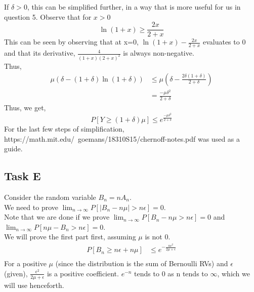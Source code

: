 \begin{enumerate}
    If $\delta > 0$, this can be simplified further, in a way that is more useful for us in question 5. Observe that for $x > 0$
    \[
        \ln(1+x) \ge \frac{2x}{2+x}
    \]
    This can be seen by observing that at x=0, $\ln(1+x)-\frac{2x}{2+x}$ evaluates to 0 and that its derivative, $\frac{4}{(1+x)(2+x)^2}$ is always non-negative.\\
    Thus, 
    \begin{align*}
        \mu (\delta - (1+\delta)\ln(1+\delta)) &\le \mu (\delta - \frac{2\delta(1+\delta)}{2+\delta})\\
        &= \frac{-\mu\delta^2}{2+\delta}
    \end{align*}
    Thus, we get,
    \begin{equation}
        \label{eq:2}
        P[Y\ge (1+\delta)\mu] \le e^{\frac{-\mu\delta^2}{2+\delta}}
    \end{equation}
    For the last few steps of simplification, https://math.mit.edu/~goemans/18310S15/chernoff-notes.pdf was used as a guide.
\end{enumerate}
\subsection{Task E}
Consider the random variable $B_n = nA_n$.\\
We need to prove $\lim_{n\to \infty}P[\lvert B_n - n\mu\rvert> n\epsilon]=0$.\\
Note that we are done if we prove $\lim_{n\to \infty}P[B_n - n\mu > n\epsilon]=0$ and $\lim_{n\to \infty}P[n\mu - B_n > n\epsilon]=0$.\\
We will prove the first part first, assuming $\mu$ is not 0.\\
\begin{align*}
    P[B_n \ge n\epsilon + n\mu] &\le e^{-\frac{n\epsilon^2}{2\mu+\epsilon}}\\
\end{align*}
For a positive $\mu$ (since the distribution is the sum of Bernoulli RVs) and $\epsilon$ (given), $\frac{\epsilon^2}{2\mu+\epsilon}$ is a positive coefficient. $e^{-n}$ tends to 0 as n tends to $\infty$, which we will use henceforth.
